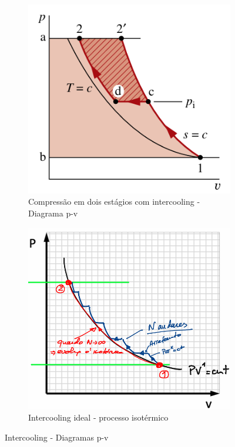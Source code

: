 \begin{figure}[H]
    \centering
    \begin{subfigure}{0.4\textwidth}
        \centering
        \includegraphics[width=\textwidth]{images/intercooling.png}
        \caption{Compressão em dois estágios com intercooling - Diagrama p-v \cite{shapiro}}
        \label{fig:intercooling}
    \end{subfigure}
    \hfill
    \begin{subfigure}{0.4\textwidth}
        \centering
        \includegraphics[width=\textwidth]{images/intercooling-isotermico.png}
        \caption{Intercooling ideal - processo isotérmico}
        \label{fig:intercooling-isotermico}
    \end{subfigure}
    \caption{Intercooling - Diagramas p-v}
\end{figure}

